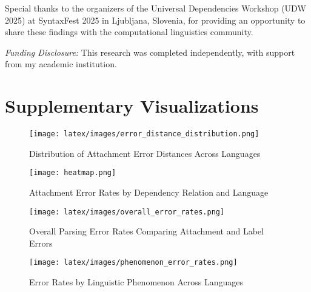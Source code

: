 \documentclass[11pt]{article}
\begin{document}
Special thanks to the organizers of the Universal Dependencies Workshop (UDW 2025) at SyntaxFest 2025 in Ljubljana, Slovenia, for providing an opportunity to share these findings with the computational linguistics community.

\textit{Funding Disclosure:} This research was completed independently, with support from my academic institution.



%


\appendix
\section {Supplementary Visualizations}
\label{sec:appendix-visualizations}

\begin{figure}[htbp]
    \centering
    \texttt{[image: latex/images/error\_distance\_distribution.png]}
    \caption{Distribution of Attachment Error Distances Across Languages}
    \label{fig:appendix-error-distances}
\end{figure}

\begin{figure}[htbp]
    \centering
    \texttt{[image: heatmap.png]}
    \caption{Attachment Error Rates by Dependency Relation and Language}
    \label{fig:appendix-error-rates-heatmap}
\end{figure}

\begin{figure}[htbp]
    \centering
    \texttt{[image: latex/images/overall\_error\_rates.png]}
    \caption{Overall Parsing Error Rates Comparing Attachment and Label Errors}
    \label{fig:appendix-overall-error-rates}
\end{figure}

\begin{figure}[htbp]
    \centering
    \texttt{[image: latex/images/phenomenon\_error\_rates.png]}
    \caption{Error Rates by Linguistic Phenomenon Across Languages}
    \label{fig:appendix-linguistic-phenomena}
\end{figure}
\end{document}
